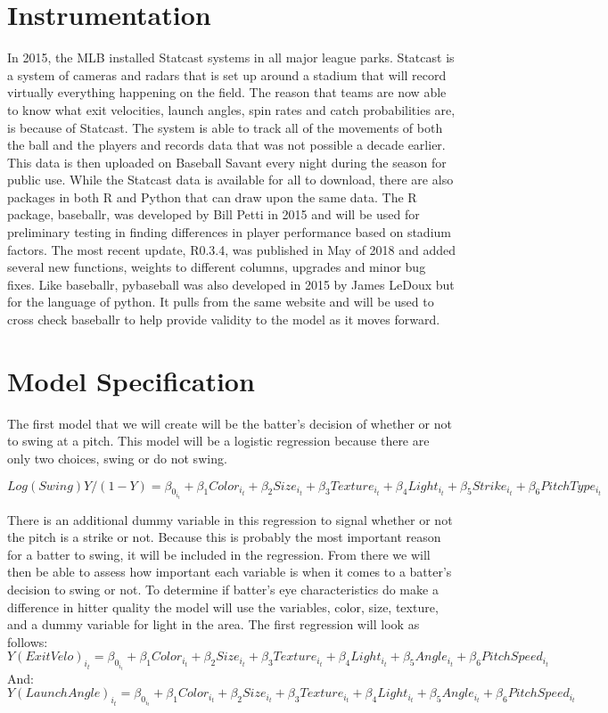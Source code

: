 \documentclass{article}
\begin{document}
\begin{doublespace}
\section{Instrumentation}
In 2015, the MLB installed Statcast systems in all major league parks. Statcast is a system of cameras and radars that is set up around a stadium that will record virtually everything happening on the field. The reason that teams are now able to know what exit velocities, launch angles, spin rates and catch probabilities are, is because of Statcast. The system is able to track all of the movements of both the ball and the players and records data that was not possible a decade earlier. This data is then uploaded on Baseball Savant every night during the season for public use. While the Statcast data is available for all to download, there are also packages in both R and Python that can draw upon the same data. 
The R package, baseballr, was developed by Bill Petti in 2015 and will be used for preliminary testing in finding differences in player performance based on stadium factors. The most recent update, R0.3.4, was published in May of 2018 and added several new functions, weights to different columns, upgrades and minor bug fixes. Like baseballr, pybaseball was also developed in 2015 by James LeDoux but for the language of python. It pulls from the same website and will be used to cross check baseballr to help provide validity to the model as it moves forward.	 

\section{Model Specification}
The first model that we will create will be the batter’s decision of whether or not to swing at a pitch. This model will be a logistic regression because there are only two choices, swing or do not swing. 
   
$$Log(Swing) Y/(1-Y)=\beta_0_i_t + \beta_1Color_i_t+ \beta_2Size_i_t+ \beta_3Texture_i_t+ \beta_4Light_i_t+ \beta_5Strike_i_t+ \beta_6Pitch Type_i_t$$ 



There is an additional dummy variable in this regression to signal whether or not the pitch is a strike or not. Because this is probably the most important reason for a batter to swing, it will be included in the regression. From there we will then be able to assess how important each variable is when it comes to a batter’s decision to swing or not.  
To determine if batter’s eye characteristics do make a difference in hitter quality the model will use the variables, color, size, texture, and a dummy variable for light in the area. The first regression will look as follows:
$$Y(ExitVelo)_i_t=\beta_0_i_t + \beta_1Color_i_t+ \beta_2Size_i_t+ \beta_3Texture_i_t+ \beta_4Light_i_t+ \beta_5Angle_i_t+ \beta_6PitchSpeed_i_t$$
And:
$$Y(LaunchAngle)_i_t=\beta_0_i_t + \beta_1Color_i_t+ \beta_2Size_i_t+ \beta_3Texture_i_t+ \beta_4Light_i_t+ \beta_5Angle_i_t+ \beta_6PitchSpeed_i_t$$



\end{doublespace}
\end{document}

